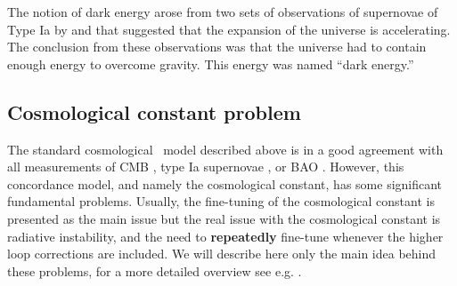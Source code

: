 The notion of dark energy arose from two sets of observations of supernovae of Type Ia by \textcite{riess} and \textcite{1999ApJ...517..565P} that suggested that the expansion of the universe is accelerating. The conclusion from these observations was that the universe had to contain enough energy to overcome gravity. This energy was named “dark energy.”

\subsection{Cosmological constant problem}
\label{ssec:lambda}
The standard cosmological \LCDM\ model described above is in a good agreement with all measurements of CMB \parencite{planck_cosm}, type Ia supernovae \parencite{Abbott_2019}, or BAO \parencite{BAO_results}. However, this concordance model, and namely the cosmological constant, has some significant fundamental problems. Usually, the fine-tuning of the cosmological constant is presented as the main issue but the real issue with the cosmological constant is radiative instability, and the need to \textbf{repeatedly} fine-tune whenever the higher loop corrections are included. We will describe here only the main idea behind these problems, for a more detailed overview see e.g. \textcite{2015arXiv150205296P,2012CRPhy..13..566M}.


